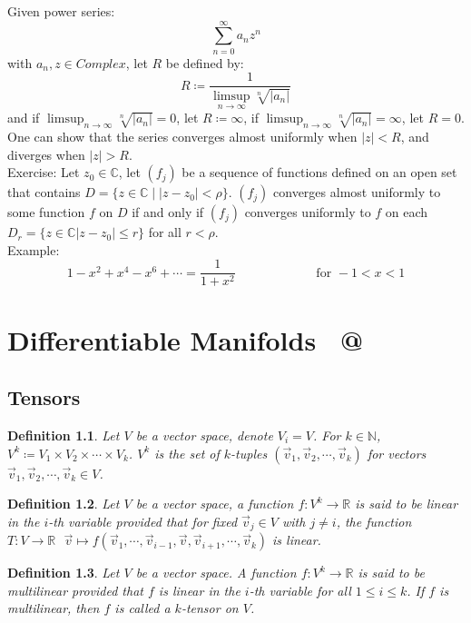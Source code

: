 \documentclass[11pt,oneside]{book}
\makeatletter
\theoremstyle{break}
\theoremstyle{break}
\newtheorem{defn}{Definition}[corL]
\newcommand{\R}{\mathbb{R}}
\newcommand{\N}{\mathbb{N}}
\newcommand{\Complex}{\mathbb{C}}
\newcommand{\example}{\color{green}Example: \color{black}}
\newcommand{\exercise}{\color{green}Exercise: \color{black}}
\newcommand*{\rom}[1]{\expandafter\@slowromancap\romannumeral #1@}
\makeatother
\begin{document}
Given power series: 
$$\sum_{n=0}^\infty a_n z^n$$
with $a_n, z \in Complex$, let $R$ be defined by:
$$R \coloneqq \frac{1}{\limsup_{n\to \infty} \sqrt[n]{|a_n|}} $$ and if $\limsup_{n\to \infty} \sqrt[n]{|a_n|}=0$, let $R \coloneqq \infty$, if $\limsup_{n\to \infty} \sqrt[n]{|a_n|} = \infty$, let $R = 0$. One can show that the series converges almost uniformly when $|z|<R$, and diverges when $|z|>R$.  \\

\exercise Let $z_0 \in \Complex$, let $(f_j)$ be a sequence of functions defined on an open set that contains $D = \{z \in \Complex \mid |z-z_0| < \rho\}$. $(f_j)$ converges almost uniformly to some function $f$ on $D$ if and only if $(f_j)$ converges uniformly to $f$ on each $D_r = \{ z \in \Complex |z-z_0|\leq r\}$ for all $r<\rho$. \\


\example
$$1-x^2 + x^4 -x^6+\cdots = \frac{1}{1+x^2} \qquad\qquad\qquad\text{ for }-1<x<1$$


\chapter{Differentiable Manifolds \ \rom{2}}
\setcounter{section}{24}
\section[Tensors]{\color{red}Tensors\color{black}}
\begin{defn}
Let $V$ be a vector space, denote $V_i = V$. For $k \in \N$, $V^k \coloneqq V_1 \times V_2 \times \cdots \times V_k$. $V^k$ is the set of $k$-tuples $(\vec{v}_1,\vec{v}_2,\cdots, \vec{v}_k)$ for vectors $\vec{v}_1,\vec{v}_2,\cdots, \vec{v}_k \in V$. 
\end{defn}

\begin{defn}
Let $V$ be a vector space, a function $f:V^k\to \R$ is said to be linear in the $i$-th variable provided that for fixed $\vec{v}_j \in V$ with $j\neq i$, the function $T:V \to \R \ \ \ \vec{v}\mapsto f(\vec{v}_1,\cdots, \vec{v}_{i-1}, \vec{v}, \vec{v}_{i+1},\cdots, \vec{v}_k)$ is linear. 
\end{defn}

\begin{defn}
Let $V$ be a vector space. A function $f:V^k \to \R$ is said to be multilinear provided that $f$ is linear in the $i$-th variable for all $1 \leq i \leq k$.  If $f$ is multilinear, then $f$ is called a $k$-tensor on $V$.
\end{defn}
\end{document}
